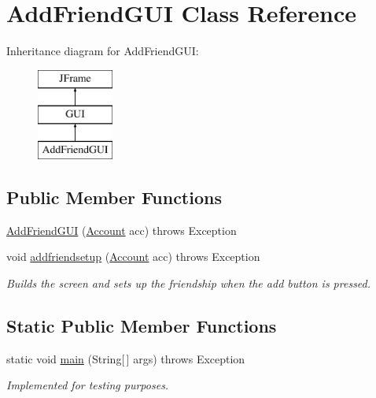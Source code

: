 \hypertarget{class_add_friend_g_u_i}{}\section{Add\+Friend\+G\+UI Class Reference}
\label{class_add_friend_g_u_i}
Inheritance diagram for Add\+Friend\+G\+UI\+:\begin{figure}[H]
\begin{center}
\leavevmode
\includegraphics[height=3.000000cm]{class_add_friend_g_u_i}
\end{center}
\end{figure}
\subsection*{Public Member Functions}
\begin{DoxyCompactItemize}
\item 
\hyperlink{class_add_friend_g_u_i_ac389076c7c3445b2aa7bc426962b3d50}{Add\+Friend\+G\+UI} (\hyperlink{class_account}{Account} acc)  throws Exception 
\item 
void \hyperlink{class_add_friend_g_u_i_a5771685be048ff39517351ff19400104}{addfriendsetup} (\hyperlink{class_account}{Account} acc)  throws Exception
\begin{DoxyCompactList}\small\item\em Builds the screen and sets up the friendship when the add button is pressed. \end{DoxyCompactList}\end{DoxyCompactItemize}
\subsection*{Static Public Member Functions}
\begin{DoxyCompactItemize}
\item 
\mbox{\label{class_add_friend_g_u_i_a7363bb35b73713abc94dc6e966b4b07e}} 
static void \hyperlink{class_add_friend_g_u_i_a7363bb35b73713abc94dc6e966b4b07e}{main} (String\mbox{[}$\,$\mbox{]} args)  throws Exception 
\begin{DoxyCompactList}\small\item\em Implemented for testing purposes. \end{DoxyCompactList}\end{DoxyCompactItemize}


